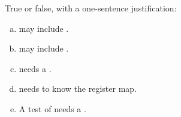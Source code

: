 \label{ex:4:5}
True or false, with a one-sentence justification:
\begin{enumerate}[a)]
  \item {} may include .
  \item {} may include .
  \item {} needs a .
  \item {} needs to know the register map.
  \item A test of  needs a .
\end{enumerate}
